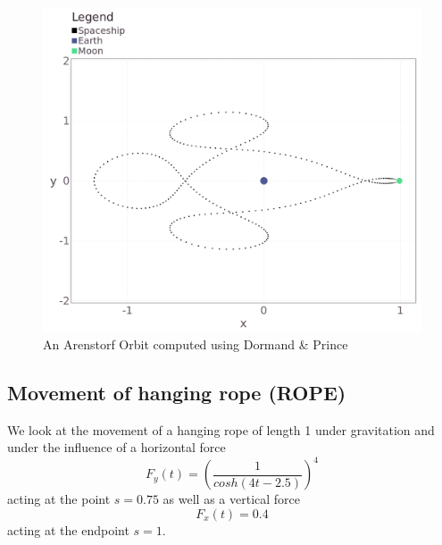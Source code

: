 \documentclass[notitlepage,12pt]{article}
\begin{document}
\begin{figure}[H]
\centering
\includegraphics[scale=0.25]{../ImagesAndPDFs/Plots/Arenstorf.png}
\caption{An Arenstorf Orbit computed using Dormand \& Prince}
\label{fig:ArnOrb}
\end{figure}

\subsection{Movement of hanging rope (ROPE)}
\label{sec:rope}

We look at the movement of a hanging rope of length 1 under gravitation and under the influence of a horizontal force
\begin{equation}
	F_y(t) = \left(\frac{1}{cosh(4t-2.5)}\right)^4
\end{equation} acting at the point $s = 0.75$ as well as a vertical force
\begin{equation}
	F_x(t) = 0.4
\end{equation} acting at the endpoint $s = 1$.\\
\end{document}
